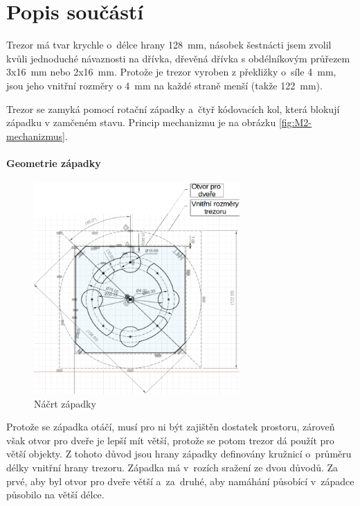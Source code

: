\section{Popis součástí}

Trezor má tvar krychle o~délce hrany 128~mm, násobek šestnácti jsem zvolil kvůli jednoduché návaznosti na dřívka, %
dřevěná dřívka s obdélníkovým průřezem 3x16~mm nebo 2x16~mm.
Protože je trezor vyroben z překližky o~síle 4~mm, jsou jeho vnitřní rozměry o 4~mm na každé straně menší (takže 122~mm).

Trezor se zamyká pomocí rotační západky a~čtyř kódovacích kol, která blokují západku v zamčeném stavu. 
Princip mechanizmu je na obrázku \ref{fig:M2-mechanizmus}.

\paragraph{Geometrie západky}
\begin{figure}[h]
	\centering
    \includegraphics[width=0.7\textwidth]{kapitoly/obrazky/M3/geometrie_zapadky.png}
    \caption{Náčrt západky} %
    \label{fig:M3-geometrie-zapadky}
\end{figure} 

Protože se západka otáčí, musí pro ni být zajištěn dostatek prostoru, zároveň však otvor pro dveře je lepší mít větší, protože se potom trezor dá použít pro větší objekty.
Z tohoto důvod jsou hrany západky definovány kružnicí o~průměru délky vnitřní hrany trezoru. Západka má v~rozích sražení ze dvou důvodů. Za prvé, aby byl otvor pro
dveře větší a~za~druhé, aby namáhání působící v~západce působilo na větší délce.


